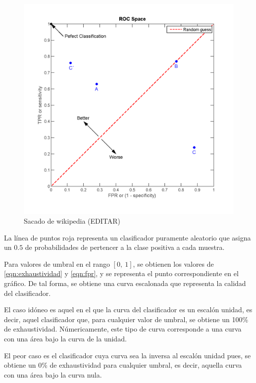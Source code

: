 \begin{figure}[h]
	\centering
	\captionsetup{justification=centering}
	\includegraphics[width=0.5\textheight]{imagenes/marco_teorico/ROC/ROC_wiki.png}	
	\caption{Sacado de wikipedia (EDITAR)}
	\label{fig:roc_curva}
\end{figure}

La línea de puntos roja representa un clasificador puramente aleatorio que asigna un $0.5$ de probabilidades de pertencer a la clase positiva a cada muestra.

Para valores de umbral en el rango $[0,\:1]$, se obtienen los valores de \ref{eqn:exhaustividad} y \ref{eqn:fpr}, y se representa el punto correspondiente en el gráfico. De tal forma, se obtiene una curva escalonada que representa la calidad del clasificador.

El caso idóneo es aquel en el que la curva del clasificador es un escalón unidad, es decir, aquel clasificador que, para cualquier valor de umbral, se obtiene un 100\% de exhaustividad. Númericamente, este tipo de curva corresponde a una curva con una área bajo la curva de la unidad.

El peor caso es el clasificador cuya curva sea la inversa al escalón unidad pues, se obtiene un 0\% de exhaustividad para cualquier umbral, es decir, aquella curva con una área bajo la curva nula.

